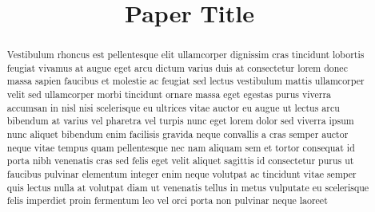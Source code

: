 \documentclass[conference]{IEEEtran}
\begin{document}

\title{Paper Title\\}


\author{
}


\maketitle


\begin{abstract}

Vestibulum rhoncus est pellentesque elit ullamcorper dignissim cras tincidunt lobortis feugiat vivamus at augue eget arcu dictum varius duis at consectetur lorem donec massa sapien faucibus et molestie ac feugiat sed lectus vestibulum mattis ullamcorper velit sed ullamcorper morbi tincidunt ornare massa eget egestas purus viverra accumsan in nisl nisi scelerisque eu ultrices vitae auctor eu augue ut lectus arcu bibendum at varius vel pharetra vel turpis nunc eget lorem dolor sed viverra ipsum nunc aliquet bibendum enim facilisis gravida neque convallis a cras semper auctor neque vitae tempus quam pellentesque nec nam aliquam sem et tortor consequat id porta nibh venenatis cras sed felis eget velit aliquet sagittis id consectetur purus ut faucibus pulvinar elementum integer enim neque volutpat ac tincidunt vitae semper quis lectus nulla at volutpat diam ut venenatis tellus in metus vulputate eu scelerisque felis imperdiet proin fermentum leo vel orci porta non pulvinar neque laoreet

\end{abstract}
\end{document}
